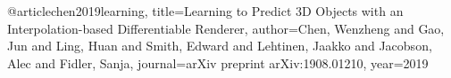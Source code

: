 @article{chen2019learning,
      title={Learning to Predict 3D Objects with an Interpolation-based Differentiable Renderer},
      author={Chen, Wenzheng and Gao, Jun and Ling, Huan and Smith, Edward and Lehtinen, Jaakko and Jacobson, Alec and Fidler, Sanja},
      journal={arXiv preprint arXiv:1908.01210},
      year={2019}
}